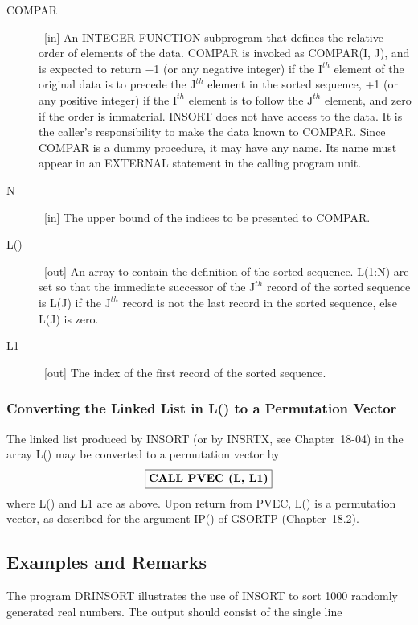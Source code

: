 \documentclass[twoside]{MATH77}
\begin{document}
\begin{description}
\item[COMPAR]  \ [in] An INTEGER FUNCTION subprogram that defines the
relative order of elements of the data. COMPAR is invoked as COMPAR(I, J),
and is expected to return $-$1 (or any negative integer) if the $\text{I}^{th}$
element of the original data is to precede the $\text{J}^{th}$ element in
the sorted sequence, +1 (or any positive integer) if the $\text{I}^{th}$
element is to follow the $\text{J}^{th}$
element, and zero if the order is immaterial. INSORT does not have access to
the data. It is the caller's responsibility to make the data known to
COMPAR. Since COMPAR is a dummy procedure, it may have any name. Its name
must appear in an EXTERNAL statement in the calling program unit.

\item[N]  \ [in] The upper bound of the indices to be presented to COMPAR.

\item[L()]  \ [out] An array to contain the definition of the sorted
sequence. L(1:N) are set so that the immediate successor of the $%
\text{J}^{th}$ record of the sorted sequence is L(J) if the $\text{J}^{th}$
record is not the last record in the sorted sequence, else L(J) is zero.

\item[L1]  \ [out] The index of the first record of the sorted sequence.
\end{description}

\subsubsection{Converting the Linked List in L() to a Permutation Vector}

The linked list produced by INSORT (or by INSRTX, see Chapter~18-04) in
the array L() may be converted to a permutation vector by
$$
\fbox{\bf CALL PVEC (L, L1)}
$$
where L() and L1 are as above. Upon return from PVEC, L() is a permutation
vector, as described for the argument IP() of GSORTP (Chapter~18.2).

\subsection{Examples and Remarks}

The program DRINSORT illustrates the use of INSORT to sort 1000 randomly
generated real numbers. The output should consist of the single line
\end{document}
